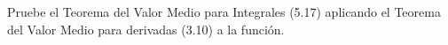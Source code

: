 \item Pruebe el Teorema del Valor Medio para Integrales (5.17) aplicando el Teorema del Valor Medio para derivadas (3.10) a la función.
